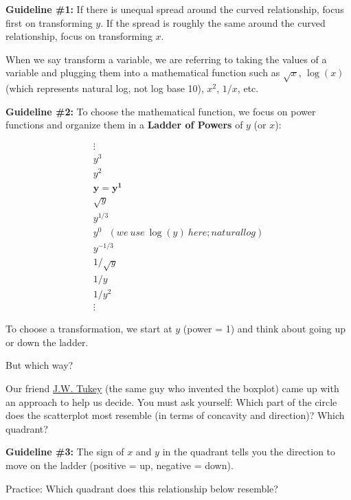 \documentclass[]{book}
\newenvironment{Shaded}{\begin{snugshade}}{\end{snugshade}}
\newcommand{\DataTypeTok}[1]{\textcolor[rgb]{0.13,0.29,0.53}{#1}}
\newcommand{\DecValTok}[1]{\textcolor[rgb]{0.00,0.00,0.81}{#1}}
\newcommand{\KeywordTok}[1]{\textcolor[rgb]{0.13,0.29,0.53}{\textbf{#1}}}
\newcommand{\NormalTok}[1]{#1}
\newcommand{\OperatorTok}[1]{\textcolor[rgb]{0.81,0.36,0.00}{\textbf{#1}}}
\newcommand{\StringTok}[1]{\textcolor[rgb]{0.31,0.60,0.02}{#1}}
\begin{document}
\textbf{Guideline \#1:} If there is unequal spread around the curved relationship, focus first on transforming \(y\). If the spread is roughly the same around the curved relationship, focus on transforming \(x\).

When we say transform a variable, we are referring to taking the values of a variable and plugging them into a mathematical function such as \(\sqrt{x}\), \(\log(x)\) (which represents natural log, not log base 10), \(x^2\), \(1/x\), etc.

\textbf{Guideline \#2:} To choose the mathematical function, we focus on power functions and organize them in a \textbf{Ladder of Powers} of \(y\) (or \(x\)):

\begin{align}
\vdots\\
y^3\\
y^2\\
\mathbf{y = y^1}\\
\sqrt{y}\\
y^{1/3}\\
y^{0} ~~~  (we~use~\log(y)~here; natural log)\\
y^{-1/3}\\
1/\sqrt{y}\\
1/y\\
1/y^2\\
\vdots
\end{align}

To choose a transformation, we start at \(y\) (power = 1) and think about going up or down the ladder.

But which way?

Our friend \href{https://en.wikipedia.org/wiki/John_Tukey}{J.W. Tukey} (the same guy who invented the boxplot) came up with an approach to help us decide. You must ask yourself: Which part of the circle does the scatterplot most resemble (in terms of concavity and direction)? Which quadrant?

\textbf{Guideline \#3:} The sign of \(x\) and \(y\) in the quadrant tells you the direction to move on the ladder (positive = up, negative = down).

Practice: Which quadrant does this relationship below resemble?

\begin{Shaded}
\end{Shaded}
\end{document}
